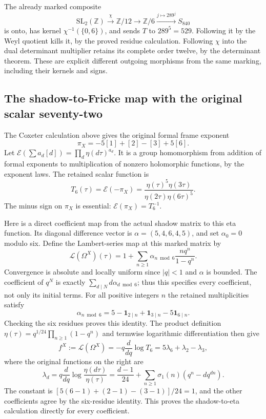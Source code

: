 The already marked composite
\[
 \mathrm{SL}_2(\mathbb Z)\xrightarrow{\chi}\mathbb Z/12
 \longrightarrow\mathbb Z/6\xrightarrow{j\mapsto289^j}S_{840}
\]
is onto, has kernel $\chi^{-1}(\{0,6\})$, and sends $T$ to
$289^5=529$.  Following it by the Weyl quotient kills it, by the
proved residue calculation.  Following $\chi$ into the dual determinant
multiplier retains its complete order twelve, by the determinant theorem.
These are explicit different outgoing morphisms from the same marking,
including their kernels and signs.

\subsection{The shadow-to-Fricke map with the original scalar seventy-two}

The Coxeter calculation above gives the original formal frame exponent
\[
 \pi_X=-5[1]+[2]-[3]+5[6].
\]
Let $\mathcal E(\sum a_d[d])=\prod_d\eta(d\tau)^{a_d}$.
It is a group homomorphism from addition of formal exponents to
multiplication of nonzero holomorphic functions, by the exponent laws.
The retained scalar function is
\[
 \boxed{T_6(\tau)=\mathcal E(-\pi_X)
 =\frac{\eta(\tau)^5\eta(3\tau)}
        {\eta(2\tau)\eta(6\tau)^5}.}
\]
The minus sign on $\pi_X$ is essential: $\mathcal E(\pi_X)=T_6^{-1}$.

Here is a direct coefficient map from the actual shadow matrix to this
eta function.  Its diagonal difference vector is
$\alpha=(5,4,6,4,5)$, and set $\alpha_0=0$ modulo six.
Define the Lambert-series map at this marked matrix by
\[
 \mathscr L(\Omega^X)(\tau)
 =1+\sum_{n\ge1}\alpha_{n\bmod6}
                    \frac{nq^n}{1-q^n}.
\]
Convergence is absolute and locally uniform since $|q|<1$ and
$\alpha$ is bounded.  The coefficient of $q^N$ is exactly
$\sum_{d\mid N}d\alpha_{d\bmod6}$; thus this specifies every
coefficient, not only its initial terms.
For all positive integers $n$ the retained multiplicities satisfy
\[
 \alpha_{n\bmod6}
 =5-\mathbf1_{2\mid n}+\mathbf1_{3\mid n}-5\mathbf1_{6\mid n}.
\]
Checking the six residues proves this identity.  The product definition
$\eta(\tau)=q^{1/24}\prod_{n\ge1}(1-q^n)$ and termwise logarithmic
differentiation then give
\[
 \boxed{f^X:=\mathscr L(\Omega^X)
 =-q\frac{d}{dq}\log T_6
 =5\lambda_6+\lambda_2-\lambda_3,}
\]
where the original functions on the right are
\[
 \lambda_d=q\frac{d}{dq}\log\frac{\eta(d\tau)}{\eta(\tau)}
 =\frac{d-1}{24}+\sum_{n\ge1}\sigma_1(n)(q^n-dq^{dn}).
\]
The constant is
$[5(6-1)+(2-1)-(3-1)]/24=1$, and the other coefficients agree by
the six-residue identity.  This proves the shadow-to-eta calculation
directly for every coefficient.

